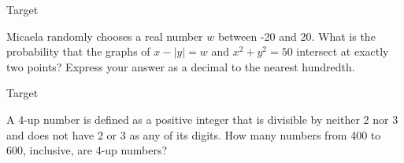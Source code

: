 \documentclass[9pt]{beamer}
\begin{document}
\begin{frame}[t]{Target \insertframenumber}
\begin{block}{}
    Micaela randomly chooses a real number $ w $ between -20 and 20. What is the probability that the graphs of $ x -|y| = w $ and $ x^2 + y^2 = 50 $ intersect at exactly two points? Express your answer as a decimal to the nearest hundredth.
    
\end{block}
\end{frame}

\begin{frame}[t]{Target \insertframenumber}
\begin{block}{}
    A 4-up number is defined as a positive integer that is divisible by neither 2 nor 3 and does not have 2 or 3 as any of its digits. How many numbers from 400 to 600, inclusive, are 4-up numbers?
    
\end{block}
\end{frame}
\end{document}
